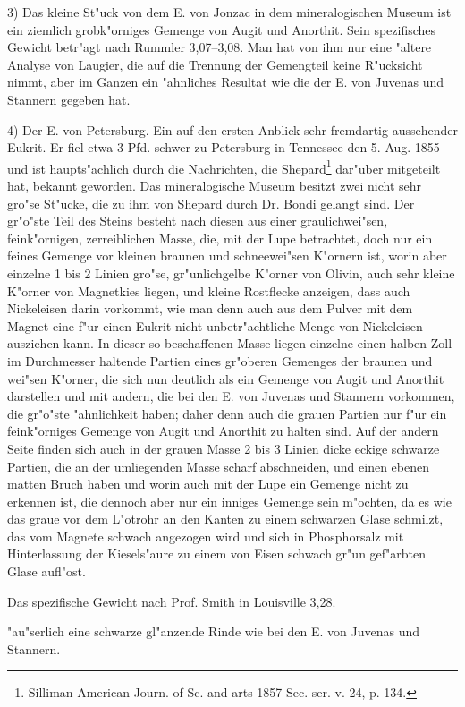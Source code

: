 \documentclass[a4paper, 11pt, oneside, german]{article}
\begin{document}
3) Das kleine St"uck von dem E. von Jonzac in dem mineralogischen Museum ist ein ziemlich grobk"orniges Gemenge von Augit und Anorthit. Sein spezifisches Gewicht betr"agt nach Rummler 3,07--3,08. Man hat von ihm nur eine "altere Analyse von Laugier, die auf die Trennung der Gemengteil keine R"ucksicht nimmt, aber im Ganzen ein "ahnliches Resultat wie die der E. von Juvenas und Stannern gegeben hat.

4) Der E. von Petersburg. Ein auf den ersten Anblick sehr fremdartig aussehender Eukrit. Er fiel etwa 3 Pfd. schwer zu Petersburg in Tennessee den 5. Aug. 1855 und ist haupts"achlich durch die Nachrichten, die Shepard\footnote{Silliman American Journ. of Sc. and arts 1857 Sec. ser. v. 24, p. 134.} dar"uber mitgeteilt hat, bekannt geworden. Das mineralogische Museum besitzt zwei nicht sehr gro"se St"ucke, die zu ihm von Shepard durch Dr. Bondi gelangt sind. Der gr"o"ste Teil des Steins besteht nach diesen aus einer graulichwei"sen, feink"ornigen, zerreiblichen Masse, die, mit der Lupe betrachtet, doch nur ein feines Gemenge vor kleinen braunen und schneewei"sen K"ornern ist, worin aber einzelne 1 bis 2 Linien gro"se, gr"unlichgelbe K"orner von Olivin, auch sehr kleine K"orner von Magnetkies liegen, und kleine Rostflecke anzeigen, dass auch Nickeleisen darin vorkommt, wie man denn auch aus dem Pulver mit dem Magnet eine f"ur einen Eukrit nicht unbetr"achtliche Menge von Nickeleisen ausziehen kann. In dieser so beschaffenen Masse liegen einzelne einen halben Zoll im Durchmesser haltende Partien eines gr"oberen Gemenges der braunen und wei"sen K"orner, die sich nun deutlich als ein Gemenge von Augit und Anorthit darstellen und mit andern, die bei den E. von Juvenas und Stannern vorkommen, die gr"o"ste "ahnlichkeit haben; daher denn auch die grauen Partien nur f"ur ein feink"orniges Gemenge von Augit und Anorthit zu halten sind. Auf der andern Seite finden sich auch in der grauen Masse 2 bis 3 Linien dicke eckige schwarze Partien, die an der umliegenden Masse scharf abschneiden, und einen ebenen matten Bruch haben und worin auch mit der Lupe ein Gemenge nicht zu erkennen ist, die dennoch aber nur ein inniges Gemenge sein m"ochten, da es wie das graue vor dem L"otrohr an den Kanten zu einem schwarzen Glase schmilzt, das vom Magnete schwach angezogen wird und sich in Phosphorsalz mit Hinterlassung der Kiesels"aure zu einem von Eisen schwach gr"un gef"arbten Glase aufl"ost.

Das spezifische Gewicht nach Prof. Smith in Louisville 3,28.

"au"serlich eine schwarze gl"anzende Rinde wie bei den E. von Juvenas und Stannern.
\end{document}
